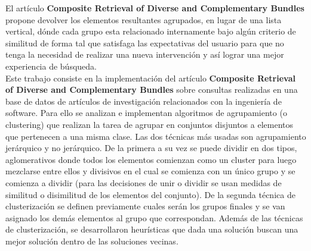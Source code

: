 El artículo \textbf{Composite Retrieval of Diverse and Complementary Bundles}\cite{compositeRetrival} propone devolver los elementos resultantes agrupados, en lugar de una lista vertical, dónde cada grupo esta relacionado internamente bajo algún criterio de similitud de forma tal que satisfaga las expectativas del usuario para que no tenga la necesidad de realizar una nueva intervención y así lograr una mejor experiencia de búsqueda.\\
Este trabajo consiste en la implementación del artículo \textbf{Composite Retrieval of Diverse and Complementary Bundles} sobre consultas realizadas en una base de datos de artículos de investigación relacionados con la ingeniería de software. Para ello se analizan e implementan algoritmos de agrupamiento (o clustering) que realizan la tarea de agrupar en conjuntos disjuntos a elementos que pertenecen a una misma clase. Las dos técnicas más usadas son agrupamiento jerárquico y no jerárquico. De la primera a su vez se puede dividir en dos tipos, aglomerativos donde todos los elementos comienzan como un cluster para luego mezclarse entre ellos y divisivos en el cual se comienza con un único grupo y se comienza a dividir (para las decisiones de unir o dividir se usan medidas de similitud o disimilitud de los elementos del conjunto). De la segunda técnica de clusterización se definen previamente cuales serán los grupos finales y se van asignado los demás elementos al grupo que correspondan. Además de las técnicas de clusterización, se desarrollaron heurísticas que dada una solución buscan una mejor solución dentro de las soluciones vecinas.\\
